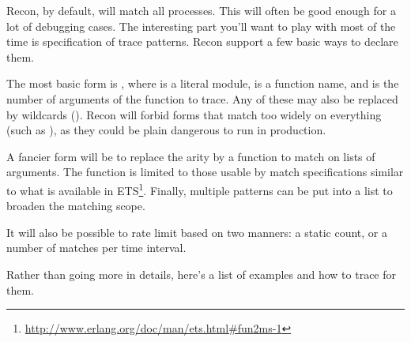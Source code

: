 \documentclass[11pt, oneside]{book}   	%
\begin{document}
Recon, by default, will match all processes. This will often be good enough for a lot of debugging cases. The interesting part you'll want to play with most of the time is specification of trace patterns. Recon support a few basic ways to declare them. 

The most basic form is , where  is a literal module,  is a function name, and  is the number of arguments of the function to trace. Any of these may also be replaced by wildcards (). Recon will forbid forms that match too widely on everything (such as ), as they could be plain dangerous to run in production.

A fancier form will be to replace the arity by a function to match on lists of arguments. The function is limited to those usable by match specifications similar to what is available in ETS\footnote{\href{http://www.erlang.org/doc/man/ets.html\#fun2ms-1}{http://www.erlang.org/doc/man/ets.html\#fun2ms-1}}. Finally, multiple patterns can be put into a list to broaden the matching scope.

It will also be possible to rate limit based on two manners: a static count, or a number of matches per time interval.

Rather than going more in details, here's a list of examples and how to trace for them.
\end{document}
